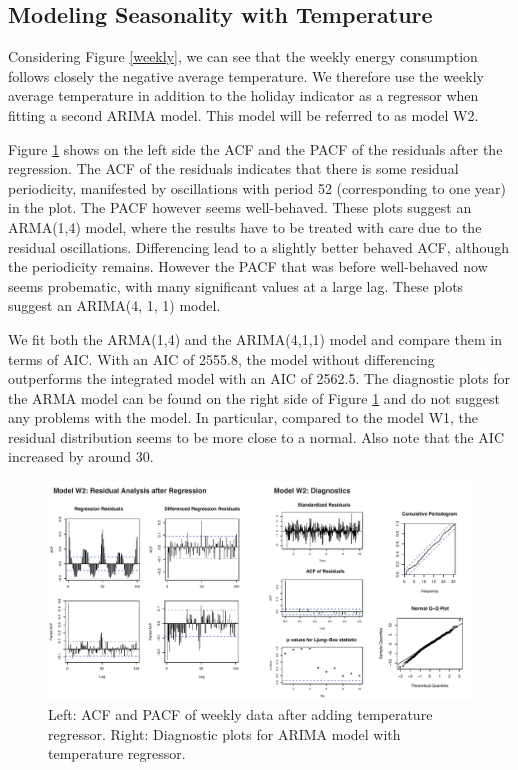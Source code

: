 \documentclass[conference]{IEEEtran}
\begin{document}
\subsection{Modeling Seasonality with Temperature}
Considering Figure \ref{weekly}, we can see that the weekly energy consumption follows closely the negative average temperature. We therefore use the weekly average temperature in addition to the holiday indicator as a regressor when fitting a second ARIMA model. This model will be referred to as model W2.
\par
Figure \ref{weekly_mod2} shows on the left side the ACF and the PACF of the residuals after the regression. The ACF of the residuals indicates that there is some residual periodicity, manifested by oscillations with period 52 (corresponding to one year) in the plot. The PACF however seems well-behaved. These plots suggest an ARMA(1,4) model, where the results have to be treated with care due to the residual oscillations. Differencing lead to a slightly better behaved ACF, although the periodicity remains. However the PACF that was before well-behaved now seems probematic, with many significant values at a large lag. These plots suggest an ARIMA(4, 1, 1) model.
\par
We fit both the ARMA(1,4) and the ARIMA(4,1,1) model and compare them in terms of AIC. With an AIC of 2555.8, the model without differencing outperforms the integrated model with an AIC of 2562.5. The diagnostic plots for the ARMA model can be found on the right side of Figure \ref{weekly_mod2} and do not suggest any problems with the model. In particular, compared to the model W1, the residual distribution seems to be more close to a normal. Also note that the AIC increased by around 30. 

\begin{figure}[ht]
	\centering
	\includegraphics[width=1\textwidth]{Figs/Fig4.pdf}
	\caption{Left: ACF and PACF of weekly data after adding temperature regressor. Right: Diagnostic plots for ARIMA model with temperature regressor.}
	\label{weekly_mod2}
\end{figure}
\end{document}
